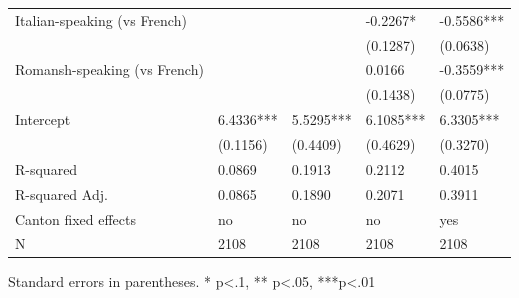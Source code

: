 \begin{table}
\begin{center}
\begin{tabular}{lllll}
Italian-speaking (vs French)         &           &           & -0.2267*  & -0.5586***  \\
                                     &           &           & (0.1287)  & (0.0638)    \\
Romansh-speaking (vs French)         &           &           & 0.0166    & -0.3559***  \\
                                     &           &           & (0.1438)  & (0.0775)    \\
Intercept                            & 6.4336*** & 5.5295*** & 6.1085*** & 6.3305***   \\
                                     & (0.1156)  & (0.4409)  & (0.4629)  & (0.3270)    \\
R-squared                            & 0.0869    & 0.1913    & 0.2112    & 0.4015      \\
R-squared Adj.                       & 0.0865    & 0.1890    & 0.2071    & 0.3911      \\
Canton fixed effects                 & no        & no        & no        & yes         \\
N                                    & 2108      & 2108      & 2108      & 2108        \\
\hline
\end{tabular}
\end{center}
\end{table}
\bigskip
Standard errors in parentheses. \newline 
* p<.1, ** p<.05, ***p<.01